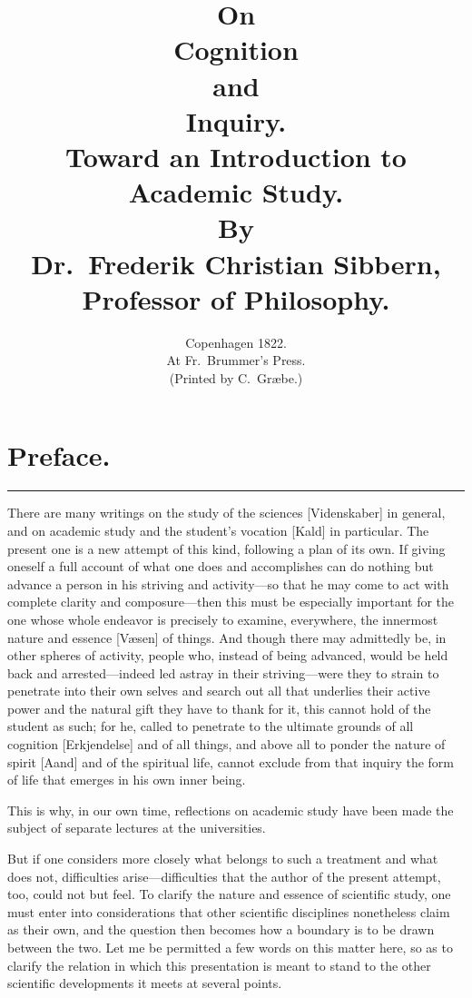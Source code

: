 \documentclass[12pt,a4paper]{book}
\title{\textbf{On}\\[6pt]
  \Huge\textbf{Cognition}\\[6pt]
  \large and\\[6pt]
  \Large\textbf{Inquiry.}\\[12pt]
  \normalsize Toward an Introduction to Academic Study.\\[16pt]
  \normalsize By\\[6pt]
  \large Dr.\ Frederik Christian Sibbern,\\[4pt]
  \normalsize Professor of Philosophy.}
\author{}
\date{Copenhagen 1822.\\
  At Fr.\ Brummer's Press.\\
  (Printed by C.\ Gr\ae be.)}
\begin{document}
\maketitle

\frontmatter

\chapter*{Preface.}

\begin{center}\rule{0.28\linewidth}{0.4pt}\end{center}

There are many writings on the study of the sciences [Videnskaber] in
general, and on academic study and the student's vocation [Kald] in
particular. The present one is a new attempt of this kind, following a plan of
its own. If giving oneself a full account of what one does and accomplishes
can do nothing but advance a person in his striving and activity---so that he
may come to act with complete clarity and composure---then this must be
especially important for the one whose whole endeavor is precisely to examine,
everywhere, the innermost nature and essence [Væsen] of things. And though
there may admittedly be, in other spheres of activity, people who, instead of
being advanced, would be held back and arrested---indeed led astray in their
striving---were they to strain to penetrate into their own selves and search
out all that underlies their active power and the natural gift they have to
thank for it, this cannot hold of the student as such; for he, called to
penetrate to the ultimate grounds of all cognition [Erkjendelse] and of all
things, and above all to ponder the nature of spirit [Aand] and of the
spiritual life, cannot exclude from that inquiry the form of life that emerges
in his own inner being.

This is why, in our own time, reflections on academic study have been made the
subject of separate lectures at the universities.

But if one considers more closely what belongs to such a treatment and what
does not, difficulties arise---difficulties that the author of the present
attempt, too, could not but feel. To clarify the nature and essence of
scientific study, one must enter into considerations that other scientific
disciplines nonetheless claim as their own, and the question then becomes how a
boundary is to be drawn between the two. Let me be permitted a few words on
this matter here, so as to clarify the relation in which this presentation is
meant to stand to the other scientific developments it meets at several points.
\end{document}
